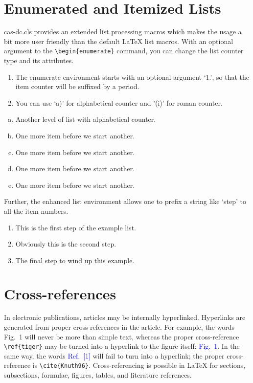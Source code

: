 \documentclass[a4paper,fleqn]{cas-dc}
\begin{document}
\section[Enumerated ...]{Enumerated and Itemized Lists}
{cas-dc.cls} provides an extended list processing macros
which makes the usage a bit more user friendly than the default
\LaTeX{} list macros.   With an optional argument to the
\verb+\begin{enumerate}+ command, you can change the list counter
type and its attributes.


\begin{enumerate}[1.]
\item The enumerate environment starts with an optional
 argument `1.', so that the item counter will be suffixed
 by a period.
\item You can use `a)' for alphabetical counter and '(i)' 
for roman counter.
\end{enumerate}
\begin{enumerate}[a)]
  \item Another level of list with alphabetical counter.
  \item One more item before we start another.
  \item One more item before we start another.
  \item One more item before we start another.
  \item One more item before we start another.
\end{enumerate}


Further, the enhanced list environment allows one to prefix a
string like `step' to all the item numbers.  


\begin{enumerate}[Step 1.]
\item This is the first step of the example list.
\item Obviously this is the second step.
\item The final step to wind up this example.
\end{enumerate}


\section{Cross-references}
In electronic publications, articles may be internally
hyperlinked. Hyperlinks are generated from proper
cross-references in the article.  For example, the words
\textcolor{black!80}{Fig.~1} will never be more than simple text,
whereas the proper cross-reference \verb+\ref{tiger}+ may be
turned into a hyperlink to the figure itself:
\textcolor{blue}{Fig.~1}.  In the same way,
the words \textcolor{blue}{Ref.~[1]} will fail to turn into a
hyperlink; the proper cross-reference is \verb+\cite{Knuth96}+.
Cross-referencing is possible in \LaTeX{} for sections,
subsections, formulae, figures, tables, and literature
references.
\end{document}
